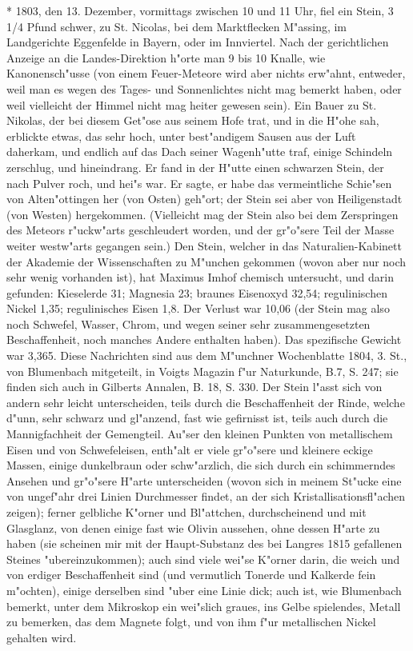 \documentclass[a4paper, 11pt, oneside, polutonikogreek, german]{article}
\begin{document}
* 1803, den 13. Dezember, vormittags zwischen 10 und 11 Uhr, fiel ein Stein, 3 1/4 Pfund schwer, zu St. Nicolas, bei dem Marktflecken M"assing, im Landgerichte Eggenfelde in Bayern, oder im Innviertel. Nach der gerichtlichen Anzeige an die Landes-Direktion h"orte man 9 bis 10 Knalle, wie Kanonensch"usse (von einem Feuer-Meteore wird aber nichts erw"ahnt, entweder, weil man es wegen des Tages- und Sonnenlichtes nicht mag bemerkt haben, oder weil vielleicht der Himmel nicht mag heiter gewesen sein). Ein Bauer zu St. Nikolas, der bei diesem Get"ose aus seinem Hofe trat, und in die H"ohe sah, erblickte etwas, das sehr hoch, unter best"andigem Sausen aus der Luft daherkam, und endlich auf das Dach seiner Wagenh"utte traf, einige Schindeln zerschlug, und hineindrang. Er fand in der H"utte einen schwarzen Stein, der nach Pulver roch, und hei"s war. Er sagte, er habe das vermeintliche Schie"sen von Alten"ottingen her (von Osten) geh"ort; der Stein sei aber von Heiligenstadt (von Westen) hergekommen. (Vielleicht mag der Stein also bei dem Zerspringen des Meteors r"uckw"arts geschleudert worden, und der gr"o"sere Teil der Masse weiter westw"arts gegangen sein.) Den Stein, welcher in das Naturalien-Kabinett der Akademie der Wissenschaften zu M"unchen gekommen (wovon aber nur noch sehr wenig vorhanden ist), hat Maximus Imhof chemisch untersucht, und darin gefunden: Kieselerde 31; Magnesia 23; braunes Eisenoxyd 32,54; regulinischen Nickel 1,35; regulinisches Eisen 1,8. Der Verlust war 10,06 (der Stein mag also noch Schwefel, Wasser, Chrom, und wegen seiner sehr zusammengesetzten Beschaffenheit, noch manches Andere enthalten haben). Das spezifische Gewicht war 3,365. Diese Nachrichten sind aus dem M"unchner Wochenblatte 1804, 3. St., von Blumenbach mitgeteilt, in Voigts Magazin f"ur Naturkunde, B.7, S. 247; sie finden sich auch in Gilberts Annalen, B. 18, S. 330. Der Stein l"asst sich von andern sehr leicht unterscheiden, teils durch die Beschaffenheit der Rinde, welche d"unn, sehr schwarz und gl"anzend, fast wie gefirnisst ist, teils auch durch die Mannigfachheit der Gemengteil. Au"ser den kleinen Punkten von metallischem Eisen und von Schwefeleisen, enth"alt er viele gr"o"sere und kleinere eckige Massen, einige dunkelbraun oder schw"arzlich, die sich durch ein schimmerndes Ansehen und gr"o"sere H"arte unterscheiden (wovon sich in meinem St"ucke eine von ungef"ahr drei Linien Durchmesser findet, an der sich Kristallisationsfl"achen zeigen); ferner gelbliche K"orner und Bl"attchen, durchscheinend und mit Glasglanz, von denen einige fast wie Olivin aussehen, ohne dessen H"arte zu haben (sie scheinen mir mit der Haupt-Substanz des bei Langres 1815 gefallenen Steines "ubereinzukommen); auch sind viele wei"se K"orner darin, die weich und von erdiger Beschaffenheit sind (und vermutlich Tonerde und Kalkerde fein m"ochten), einige derselben sind "uber eine Linie dick; auch ist, wie Blumenbach bemerkt, unter dem Mikroskop ein wei"slich graues, ins Gelbe spielendes, Metall zu bemerken, das dem Magnete folgt, und von ihm f"ur metallischen Nickel gehalten wird.
\end{document}
